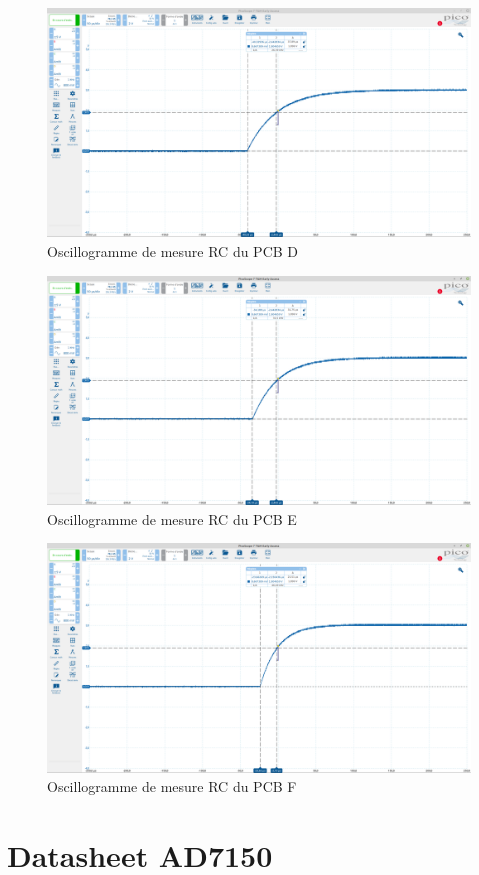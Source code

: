 \begin{figure}[!ht]
  \includegraphics[width=16cm]{figuresMeasure/d}
  \caption{Oscillogramme de mesure RC du PCB D}
\end{figure}

\newpage

\begin{figure}[!ht]
  \includegraphics[width=16cm]{figuresMeasure/e}
  \caption{Oscillogramme de mesure RC du PCB E}
\end{figure}

\begin{figure}[!ht]
  \includegraphics[width=16cm]{figuresMeasure/f}
  \caption{Oscillogramme de mesure RC du PCB F}
\end{figure}


\newpage

\section{Datasheet AD7150}
\label{dataad}


